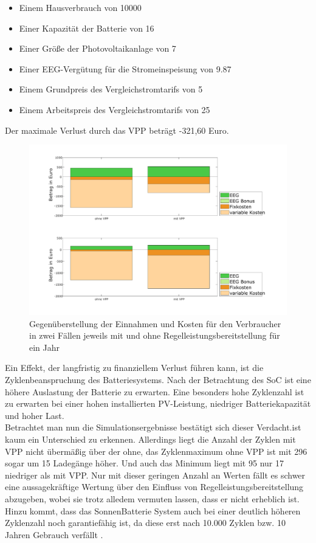 \begin{itemize}
\itemsep-0.5em
	\item Einem Hausverbrauch von \SI{10000}{\kwh}
	\item Einer Kapazität der Batterie von \SI{16}{\kwh}
	\item Einer Größe der Photovoltaikanlage von \SI{7}{\kwp}
	\item Einer EEG-Vergütung für die Stromeinspeisung von \SI{9.87}{\ctkwh}
	\item Einem Grundpreis des Vergleichstromtarifs von \SI{5}{\Eurkwh}
	\item Einem Arbeitspreis des Vergleichstromtarifs von \SI{25}{\ctkwh}
\end{itemize}

Der maximale Verlust durch das VPP beträgt -321,60 Euro.
\begin{figure}[H]
	\begin{center}
		\includegraphics[width=\textwidth]{Bilder/Gegenueberstellung_Bilanz.pdf}
		\caption{Gegenüberstellung der Einnahmen und Kosten für den Verbraucher in zwei Fällen jeweils mit und ohne Regelleistungsbereitstellung für ein Jahr}
		\label{fig:Bilanz_minmax}
	\end{center}
\end{figure}

Ein Effekt, der langfristig zu finanziellem Verlust führen kann, ist die Zyklenbeanspruchung des Batteriesystems. Nach der Betrachtung des SoC ist eine höhere Auslastung der Batterie zu erwarten. Eine besonders hohe Zyklenzahl ist zu erwarten bei einer hohen installierten PV-Leistung, niedriger Batteriekapazität und hoher Last. \\
Betrachtet man nun die Simulationsergebnisse bestätigt sich dieser Verdacht.ist kaum ein Unterschied zu erkennen. Allerdings liegt die Anzahl der Zyklen mit VPP nicht übermäßig über der ohne, das Zyklenmaximum ohne VPP ist mit 296 sogar um 15 Ladegänge höher. Und auch das Minimum liegt mit 95 nur 17 niedriger als mit VPP. Nur mit dieser geringen Anzahl an Werten fällt es schwer eine aussagekräftige Wertung über den Einfluss von Regelleistungsbereitstellung abzugeben, wobei sie trotz alledem vermuten lassen, dass er nicht erheblich ist. Hinzu kommt, dass das SonnenBatterie System auch bei einer deutlich höheren Zyklenzahl noch garantiefähig ist, da diese erst nach 10.000 Zyklen bzw. 10 Jahren Gebrauch verfällt \cite{sonnenBat18}.

